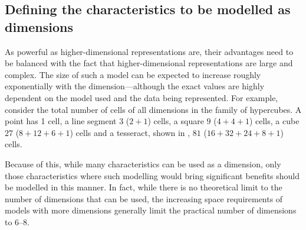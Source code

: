 \subsection{Defining the characteristics to be modelled as dimensions}
\label{ss:dimensions}

As powerful as higher-dimensional representations are, their advantages need to be balanced with the fact that higher-dimensional representations are large and complex.
The size of such a model can be expected to increase roughly exponentially with the dimension---although the exact values are highly dependent on the model used and the data being represented.
For example, consider the total number of cells of all dimensions in the family of hypercubes.
A point has 1 cell, a line segment $3$ ($2+1$) cells, a square $9$ ($4+4+1$) cells, a cube $27$ ($8+12+6+1$) cells and a tesseract, shown in , $81$ ($16+32+24+8+1$) cells.

Because of this, while many characteristics can be used as a dimension, only those characteristics where such modelling would bring significant benefits should be modelled in this manner.
In fact, while there is no theoretical limit to the number of dimensions that can be used, the increasing space requirements of models with more dimensions generally limit the practical number of dimensions to 6--8.

